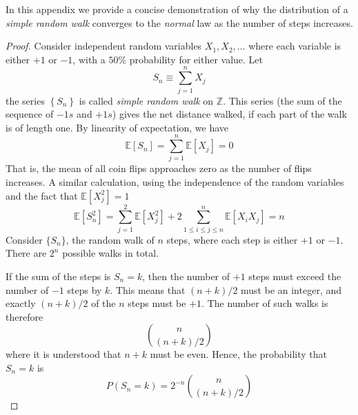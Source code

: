 In this appendix we provide a concise demonstration of why the distribution of a \textit{simple random walk} converges to the \textit{normal} law as the number of steps increases.\\
\begin{proof}
Consider independent random variables $X_1, X_2, \hdots$ where each variable is either $+1$ or $-1$, with a $50\%$ probability for either value.
Let 
\begin{equation*}
    S_n \equiv \sum_{j=1}^n X_j
\end{equation*}
the series $\left\{S_n\right\}$ is called \textit{simple random walk} on $\mathbb{Z}$. This series (the sum of the sequence of $-1s$ and $+1s$) gives the net distance walked, if each part of the walk is of length one. By linearity of expectation, we have 
\begin{equation*}
    \mathbb{E}[S_n]= \sum_{j=1}^n \mathbb{E}[X_j] = 0
\end{equation*}
That is, the mean of all coin flips approaches zero as the number of flips increases.
A similar calculation, using the independence of the random variables and the fact that $\mathbb{E}[X_j^2] = 1$
\begin{equation*}
    \mathbb{E}[S^2_n] = \sum_{j=1}^2 \mathbb{E}[X_j^2] + 2\sum_{1\leq i \leq j \leq n}^n \mathbb{E} [X_i X_j] = n
\end{equation*}
Consider $\{S_n\}$, the random walk of $n$ steps, where each step is either $+1$ or $-1$. 
There are $2^n$ possible walks in total. 

If the sum of the steps is $S_n = k$, then the number of $+1$ steps must exceed 
the number of $-1$ steps by $k$. This means that $(n+k)/2$ must be an integer, 
and exactly $(n+k)/2$ of the $n$ steps must be $+1$. 
The number of such walks is therefore
\begin{equation*}
    \binom{n}{(n+k)/2}
\end{equation*}
where it is understood that $n+k$ must be even. 
Hence, the probability that $S_n = k$ is
\begin{equation*}
    P(S_n = k) = 2^{-n} \binom{n}{(n+k)/2}
\end{equation*}


\end{proof}

